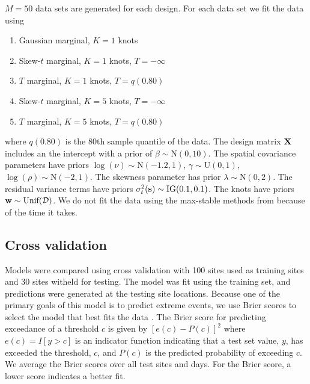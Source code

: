 \documentclass[11pt]{article}
\begin{document}
$M = 50$ data sets are generated for each design.
For each data set we fit the data using
\begin{enumerate} \setlength{\itemsep}{-0.5em}
  \item Gaussian marginal, $K=1$ knots
  \item Skew-$t$ marginal, $K=1$ knots, $T=-\infty$
  \item $T$ marginal, $K=1$ knots, $T=q(0.80)$
  \item Skew-$t$ marginal, $K=5$ knots, $T=-\infty$
  \item $T$ marginal, $K=5$ knots, $T=q(0.80)$
\end{enumerate}
where $q(0.80)$ is the 80th sample quantile of the data.
The design matrix $\mbox{\bf X}$ includes an the intercept with a prior of $\beta \sim \text{N}(0, 10)$.
The spatial covariance parameters have priors $\log(\nu) \sim \text{N}(-1.2, 1)$, $\gamma \sim \text{U}(0, 1)$, $\log(\rho) \sim \text{N}(-2, 1)$.
The skewness parameter has prior $\lambda \sim \text{N}(0, 2)$.
The residual variance terms have priors $\sigma^2_t(\mbox{\bf s}) \sim \text{IG}(0.1, 0.1)$.
The knots have priors $\mbox{\bf w} \sim \text{Unif}({\cal D})$.
We do not fit the data using the max-stable methods from \citet{Reich2012} because of the time it takes.

\subsection{Cross validation}\label{s:modelselect}
Models were compared using cross validation with 100 sites used as training sites and 30 sites witheld for testing.
The model was fit using the training set, and predictions were generated at the testing site locations.
Because one of the primary goals of this model is to predict extreme events, we use Brier scores to select the model that best fits the data \citep{Gneiting2007}.
The Brier score for predicting exceedance of a threshold $c$ is given by $[e(c) - P(c)]^2$ where $e(c) = I[y>c]$ is an indicator function indicating that a test set value, $y$, has exceeded the threshold, $c$, and $P(c)$ is the predicted probability of exceeding $c$.
We average the Brier scores over all test sites and days.
For the Brier score, a lower score indicates a better fit.
\end{document}
